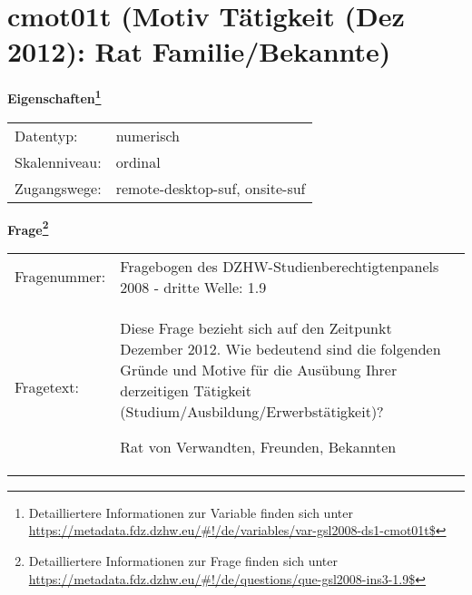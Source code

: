 
    \setcounter{footnote}{0}

    \vspace*{-1.8cm}
	\section{cmot01t (Motiv Tätigkeit (Dez 2012): Rat Familie/Bekannte)}
	\label{section:cmot01t}



    \vspace*{0.5cm}
    \noindent\textbf{Eigenschaften\footnote{Detailliertere Informationen zur Variable finden sich unter
		\url{https://metadata.fdz.dzhw.eu/\#!/de/variables/var-gsl2008-ds1-cmot01t$}}}\\
	\begin{tabularx}{\hsize}{@{}lX}
	Datentyp: & numerisch \\
	Skalenniveau: & ordinal \\
	Zugangswege: &
	  remote-desktop-suf, 
	  onsite-suf
 \\
    \end{tabularx}



				\vspace*{0.5cm}
                \noindent\textbf{Frage\footnote{Detailliertere Informationen zur Frage finden sich unter
		              \url{https://metadata.fdz.dzhw.eu/\#!/de/questions/que-gsl2008-ins3-1.9$}}}\\
				\begin{tabularx}{\hsize}{@{}lX}
					Fragenummer: &
					  Fragebogen des DZHW-Studienberechtigtenpanels 2008 - dritte Welle:
					  1.9
 \\
					Fragetext: & Diese Frage bezieht sich auf den Zeitpunkt Dezember 2012. Wie bedeutend sind die folgenden Gründe und Motive für die Ausübung Ihrer derzeitigen Tätigkeit (Studium/Ausbildung/Erwerbstätigkeit)?\par  Rat von Verwandten, Freunden, Bekannten \\
				\end{tabularx}





